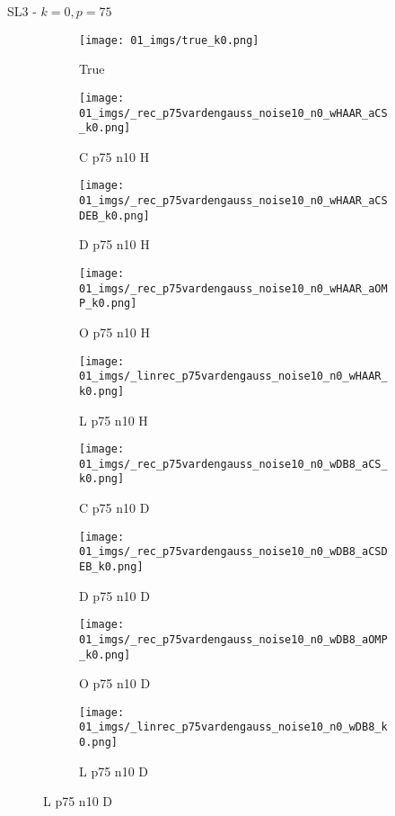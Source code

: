 \begin{frame}{SL3 - $k=0,p=75$}{}
\begin{figure}
\begin{subfigure}{0.1\textwidth}
\texttt{[image: 01\_imgs/true\_k0.png]}
\caption*{\Tiny True}
\end{subfigure}
\begin{subfigure}{0.1\textwidth}
\texttt{[image: 01\_imgs/\_rec\_p75vardengauss\_noise10\_n0\_wHAAR\_aCS\_k0.png]}
\caption*{\Tiny C p75 n10 H}
\end{subfigure}
\begin{subfigure}{0.1\textwidth}
\texttt{[image: 01\_imgs/\_rec\_p75vardengauss\_noise10\_n0\_wHAAR\_aCSDEB\_k0.png]}
\caption*{\Tiny D p75 n10 H}
\end{subfigure}
\begin{subfigure}{0.1\textwidth}
\texttt{[image: 01\_imgs/\_rec\_p75vardengauss\_noise10\_n0\_wHAAR\_aOMP\_k0.png]}
\caption*{\Tiny O p75 n10 H}
\end{subfigure}
\begin{subfigure}{0.1\textwidth}
\texttt{[image: 01\_imgs/\_linrec\_p75vardengauss\_noise10\_n0\_wHAAR\_k0.png]}
\caption*{\Tiny L p75 n10 H}
\end{subfigure}
\begin{subfigure}{0.1\textwidth}
\texttt{[image: 01\_imgs/\_rec\_p75vardengauss\_noise10\_n0\_wDB8\_aCS\_k0.png]}
\caption*{\Tiny C p75 n10 D}
\end{subfigure}
\begin{subfigure}{0.1\textwidth}
\texttt{[image: 01\_imgs/\_rec\_p75vardengauss\_noise10\_n0\_wDB8\_aCSDEB\_k0.png]}
\caption*{\Tiny D p75 n10 D}
\end{subfigure}
\begin{subfigure}{0.1\textwidth}
\texttt{[image: 01\_imgs/\_rec\_p75vardengauss\_noise10\_n0\_wDB8\_aOMP\_k0.png]}
\caption*{\Tiny O p75 n10 D}
\end{subfigure}
\begin{subfigure}{0.1\textwidth}
\texttt{[image: 01\_imgs/\_linrec\_p75vardengauss\_noise10\_n0\_wDB8\_k0.png]}
\caption*{\Tiny L p75 n10 D}
\end{subfigure}

\vspace{5pt}


\end{figure}
\end{frame}

